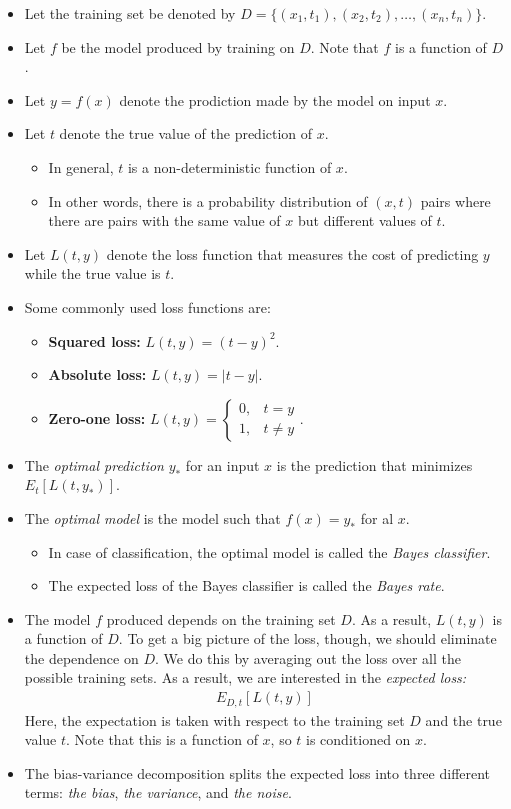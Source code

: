 \documentclass[10pt]{article}
\begin{document}
  \begin{itemize}
  	\item Let the training set be denoted by $D = \{(x_1, t_1), (x_2, t_2), \dotsc, (x_n, t_n)\}.$ 
  	\item Let $f$ be the model produced by training on $D$. Note that $f$ is a function of $D$.
  	\item Let $y = f(x)$ denote the prodiction made by the model on input $x$.
  	\item Let $t$ denote the true value of the prediction of $x$. 
  	\begin{itemize}
  	  \item In general, $t$ is a non-deterministic function of $x$.
  	  \item In other words, there is a probability distribution of $(x,t)$ pairs where there are pairs with the same value of $x$ but different values of $t$.
  	\end{itemize}  	
  	\item Let $L(t,y)$ denote the loss function that measures the cost of predicting $y$ while the true value is $t$.
  	\item Some commonly used loss functions are:
  	\begin{itemize}
  	  \item {\bf Squared loss:} $L(t,y) = (t-y)^2$.
  	  \item {\bf Absolute loss:} $L(t,y) = |t-y|$.
  	  \item {\bf Zero-one loss:} $L(t,y) = \begin{cases} 0, & t = y \\ 1, & t \neq y \end{cases}.$
  	\end{itemize}
  	\item The \emph{optimal prediction} $y_*$ for an input $x$ is the prediction that minimizes $E_t[L(t, y_*)]$.
  	\item The \emph{optimal model} is the model such that $f(x) = y_*$ for al $x$.
  	\begin{itemize}
  	  \item In case of classification, the optimal model is called the \emph{Bayes classifier}.
  	  \item The expected loss of the Bayes classifier is called the \emph{Bayes rate}.  	  
  	\end{itemize}
  	\item The model $f$ produced depends on the training set $D$. As a result, $L(t,y)$ is a function of $D$. To get a big picture of the loss, though, we should eliminate the dependence on $D$. We do this by averaging out the loss over all the possible training sets. As a result, we are interested in the \emph{expected loss:}
  	\begin{align*}
  	  E_{D,t}[L(t,y)]
  	\end{align*}
    Here, the expectation is taken with respect to the training set $D$ and the true value $t$. Note that this is a function of $x$, so $t$ is conditioned on $x$.
    \item The bias-variance decomposition splits the expected loss into three different terms: \emph{the bias}, \emph{the variance}, and \emph{the noise}.    
  \end{itemize}
\end{document}
